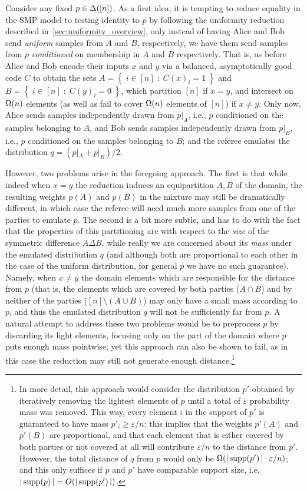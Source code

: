 \documentclass[11pt]{article}
\theoremstyle{remark}   	\newtheorem{remark}[theorem]{Remark}
\theoremstyle{definition}   	\newaliascnt{defn}{theorem}
\newcommand{\eps}{\ensuremath{\varepsilon}\xspace}
\newcommand{\bigO}[1]{{O\mleft( #1 \mright)}}
\newcommand{\bigOmega}[1]{{\Omega\mleft( #1 \mright)}}
\newcommand{\setOfSuchThat}[2]{ \left\{\; #1 \;\colon\; #2\; \right\} } 			\newcommand{\indicSet}[1]{\mathds{1}_{#1}}                                              \newcommand{\indic}[1]{\indicSet{\left\{#1\right\}}}                                             \newcommand{\disjunion}{\amalg}
\newcommand{\supp}[1]{\operatorname{supp}\!\left(#1\right)}
\begin{document}
Consider any fixed $p\in\Delta\!\left([n]\right)$. As a first idea, it is tempting to reduce equality in the SMP model to testing identity to $p$ by following the uniformity reduction described in~\autoref{sec:uniformity_overview}, only instead of having Alice and Bob send \emph{uniform} samples from $A$ and $B$, respectively, we have them send samples from $p$ \emph{conditioned} on membership in $A$ and $B$ respectively. That is, as before Alice and Bob encode their inputs $x$ and $y$ via a balanced, asymptotically good code $C$ to obtain the sets $A = \setOfSuchThat{ i\in[n] }{ C(x)_i = 1 }$ and $B = \setOfSuchThat{ i\in[n] }{ C(y)_i = 0 }$, which partition $[n]$ if $x=y$, and intersect on $\bigOmega{n}$ elements (as well as fail to cover $\bigOmega{n}$ elements of $[n]$) if $x \neq y$. Only now, Alice sends samples independently drawn from $p|_A$, i.e., $p$ conditioned on the samples belonging to $A$, and Bob sends samples independently drawn from $p|_B$, i.e., $p$ conditioned on the samples belonging to $B$; and the referee emulates the distribution $q = (p|_A + p|_B)/2$.

However, two problems arise in the foregoing approach. The first is that while indeed when $x=y$ the reduction induces an equipartition $A,B$ of the domain, the resulting weights $p(A)$ and $p(B)$ in the mixture may still be dramatically different, in which case the referee will need much more samples from one of the parties to emulate $p$. The second is a bit more subtle, and has to do with the fact that the properties of this partitioning are with respect to the \emph{size} of the symmetric difference $A\Delta B$, while really we are concerned about its \emph{mass} under the emulated distribution $q$ (and although both are proportional to each other in the case of the uniform distribution, for general $p$ we have no such guarantee). Namely, when $x \neq y$ the domain elements which are responsible for the  distance from $p$ (that is, the elements which are covered by both parties ($A\cap B$) and by neither of the parties ($[n] \setminus (A\cup B)$) may only have a small mass according to $p$, and thus the emulated distribution $q$ will not be sufficiently far from $p$. A natural attempt to address these two problems would be to preprocess $p$ by discarding its light elements, focusing only on the part of the domain where $p$ puts enough mass pointwise; yet this approach can also be shown to fail, as in this case the reduction may still not generate enough distance.\footnote{In more detail, this approach would consider the distribution $p'$ obtained by iteratively removing the lightest elements of $p$ until a total of $\eps$ probability mass was removed. This way, every element $i$ in the support of $p'$ is guaranteed to have mass $p'_i \geq \eps/n$: this implies that the weights $p'(A)$ and $p'(B)$ are proportional, and that each element that is either covered by both parties or not covered at all will contribute $\eps/n$ to the distance from $p'$. However, the total distance of $q$ from $p$ would only be $\bigOmega{|\supp{p'}| \cdot \eps/n}$; and this only suffices if $p$ and $p'$ have comparable support size, i.e. $|\supp{p}| = \bigO{|\supp{p'}|}$.}
\end{document}
